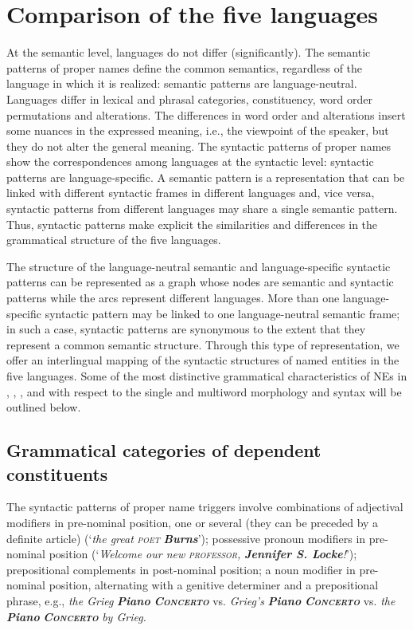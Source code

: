 \documentclass[output=paper]{langsci/langscibook}
\newcommand{\trigger}[1]{\textsc{#1}}
\begin{document}
\section{Comparison of the five languages}

At the semantic level, languages do not differ (significantly). The
semantic patterns of proper names define the common semantics,
regardless of the language in which it is realized: semantic patterns
are language-neutral. Languages differ in lexical and phrasal
categories, constituency, word order permutations and alterations. The
differences in word order and alterations insert some nuances in the
expressed meaning, i.e., the viewpoint of the speaker, but they do not
alter the general meaning. The syntactic patterns of proper names show
the correspondences among languages at the syntactic level: syntactic
patterns are language-specific. A semantic pattern is a representation
that can be linked with different syntactic frames in different
languages and, vice versa, syntactic patterns from different languages
may share a single semantic pattern. Thus, syntactic patterns make
explicit the similarities and differences in the grammatical structure
of the five languages.



The structure of the language-neutral semantic and language-specific
syntactic patterns can be represented as a graph whose nodes are
semantic and syntactic patterns while the arcs represent different
languages. More than one language-specific syntactic pattern may be
linked to one language-neutral semantic frame; in such a case,
syntactic patterns are synonymous to the extent that they represent a
common semantic structure. Through this type of representation, we
offer an interlingual mapping of the syntactic structures of named
entities in the five languages. Some of the most distinctive
grammatical characteristics of NEs in , , , 
and  with respect to the single and multiword morphology and
syntax will be outlined below.

\subsection{Grammatical categories of dependent constituents} %

The syntactic patterns of  proper name triggers involve
combinations of adjectival modifiers in pre-nominal position, one or
several (they can be preceded by a definite article) (‘\textit{the
great }\textit{\trigger{poet}} \textbf{\textit{Burns}}’); possessive
pronoun modifiers in pre-nominal position (‘\textit{Welcome our new
}\textit{\trigger{professor}}\textit{, }\textbf{\textit{Jennifer S.
Locke}}\textit{!}’); prepositional complements in post-nominal
position; a noun modifier in pre-nominal position, alternating with a
genitive determiner and a prepositional phrase, e.g., \textit{the Grieg
}\textbf{\textit{Piano }}\textbf{\textit{\trigger{Concerto}}} vs.
\textit{Grieg’s }\textbf{\textit{Piano
}}\textbf{\textit{\trigger{Concerto}}} vs. \textit{the
}\textbf{\textit{Piano }}\textbf{\textit{\trigger{Concerto}}} \textit{by
Grieg.}
\end{document}

